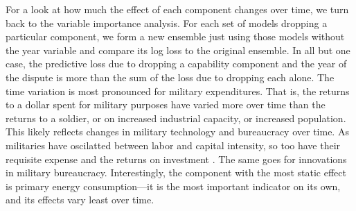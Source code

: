 For a look at how much the effect of each component changes over time, we turn back to the variable importance analysis.
For each set of models dropping a particular component, we form a new ensemble just using those models without the year variable and compare its log loss to the original ensemble.
In all but one case, the predictive loss due to dropping a capability component and the year of the dispute is more than the sum of the loss due to dropping each alone.
The time variation is most pronounced for military expenditures.
That is, the returns to a dollar spent for military purposes have varied more over time than the returns to a soldier, or on increased industrial capacity, or increased population.
This likely reflects changes in military technology and bureaucracy over time.
As militaries have oscilatted between labor and capital intensity, so too have their requisite expense and the returns on investment \citep{howardWar}.
The same goes for innovations in military bureaucracy.
Interestingly, the component with the most static effect is primary energy consumption---it is the most important indicator on its own, and its effects vary least over time.


